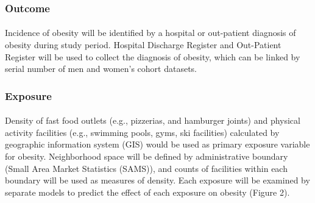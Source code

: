 \documentclass[12]{article}
\begin{document}
\subsubsection{Outcome}
\paragraph{}    
Incidence of obesity will be identified by a hospital or out-patient diagnosis of obesity during study period. Hospital Discharge Register and Out-Patient Register will be used to collect the diagnosis of obesity, which can be linked by serial number of men and women's cohort datasets.
\subsubsection{Exposure}
\paragraph{}
Density of fast food outlets (e.g., pizzerias, and hamburger joints) and physical activity facilities (e.g., swimming pools, gyms, ski facilities) calculated by geographic information system (GIS) would be used as primary exposure variable for obesity. Neighborhood space will be defined by administrative boundary (Small Area Market Statistics (SAMS)), and counts of facilities within each boundary will be used as measures of density. Each exposure will be examined by separate models to predict the effect of each exposure on obesity (Figure 2). 
\end{document}
